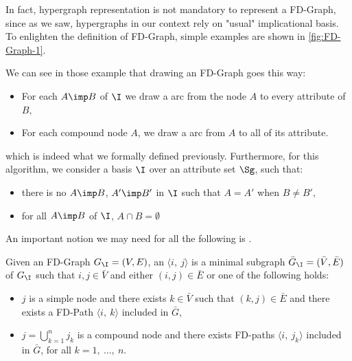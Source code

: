 In fact, hypergraph representation is not mandatory to represent a FD-Graph, 
since as we saw, hypergraphs in our context rely on "usual" implicational 
basis. To enlighten the definition of FD-Graph, simple examples are shown in 
\ref{fig:FD-Graph-1}.

\begin{center}
	
\end{center}

We can see in those example that drawing an FD-Graph goes this way:
\begin{itemize}
	\item For each $A \imp B$ of $\I$ we draw a  arc from the node
	$A$ to every attribute of $B$,
	\item For each compound node $A$, we draw a  arc from
	$A$ to all of its attribute.
\end{itemize}
\noindent which is indeed what we formally defined previously. Furthermore, for
this algorithm, we consider a basis $\I$ over an attribute set $\Sg$, such that:
\begin{itemize}
	\item there is no $A \imp B$, $A' \imp B'$ in $\I$ such that $A = A'$ when
	$B \neq B'$,
	\item for all $A \imp B$ of $\I$, $A \cap B = \emptyset$
\end{itemize}

\vspace{1.2em}

An important notion we may need for all the following is .

\begin{definition} Given an FD-Graph $G_{\I} = (V, E)$, an
 $\langle i, \ j \rangle$ is a minimal subgraph $\bar{G}_{\I} = 
(\bar{V}, \bar{E})$ of $G_{\I}$ such that $i, j \in \bar{V}$ and either $(i, j)
\in \bar{E}$ or one of the following holds:

\begin{itemize}
	\item $j$ is a simple node and there exists $k \in \bar{V}$ such that $(k, 
	j) \in \bar{E}$ and there exists a FD-Path $\langle i, \ k \rangle$ included
	in $\bar{G}$,  
	\item $j = \bigcup_{k = 1}^n j_k$ is a compound node and there exists 
	FD-paths $\langle i, \ j_k \rangle$ included in $\bar{G}$, for all $k = 1, 
	\ \dots, \ n$.
\end{itemize}
	
\end{definition}

